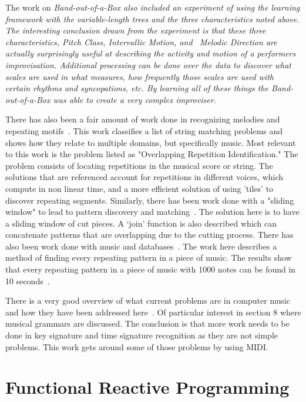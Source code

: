 \documentclass[12pt]{ucthesis}
\begin{document}
The work on \em{Band-out-of-a-Box }\em also included an experiment of using the learning framework with the variable-length trees and the three characteristics noted above. The interesting conclusion drawn from the experiment is that these three characteristics, \em{Pitch Class, Intervallic Motion, }\em and  ~\em{Melodic Direction }\em are actually surprisingly useful at describing the activity and motion of a performers improvisation. Additional processing can be done over the data to discover what scales are used in what measures, how frequently those scales are used with certain rhythms and syncopations, etc. By learning all of these things the \em{Band-out-of-a-Box }\em was able to create a very complex improviser.

There has also been a fair amount of work done in recognizing melodies and repeating motifs~\cite{MelodicRecognition}. This work classifies a list of string matching problems and shows how they relate to multiple domains, but specifically music. Most relevant to this work is the problem listed as "Overlapping Repetition Identification." The problem consists of locating repetitions in the musical score or string. The solutions that are referenced account for repetitions in different voices, which compute in non linear time, and a more efficient solution of using 'tiles' to discover repeating segments. Similarly, there has been work done with a "sliding window" to lead to pattern discovery and matching~\cite{slidingWindow}. The solution here is to have a sliding window of cut pieces. A `join' function is also described which can concatenate patterns that are overlapping due to the cutting process. There has also been work done with music and databases~\cite{musicDB}. The work here describes a method of finding every repeating pattern in a piece of music. The results show that every repeating pattern in a piece of music with 1000 notes can be found in 10 seconds~\cite{musicDB}.

There is a very good overview of what current problems are in computer music and how they have been addressed here~\cite{Gerhard}. Of particular interest in section 8 where musical grammars are discussed. The conclusion is that more work needs to be done in key signature and time signature recognition as they are not simple problems. This work gets around some of those problems by using MIDI.

\section{Functional Reactive Programming}
\label{rw:frp}
\end{document}
